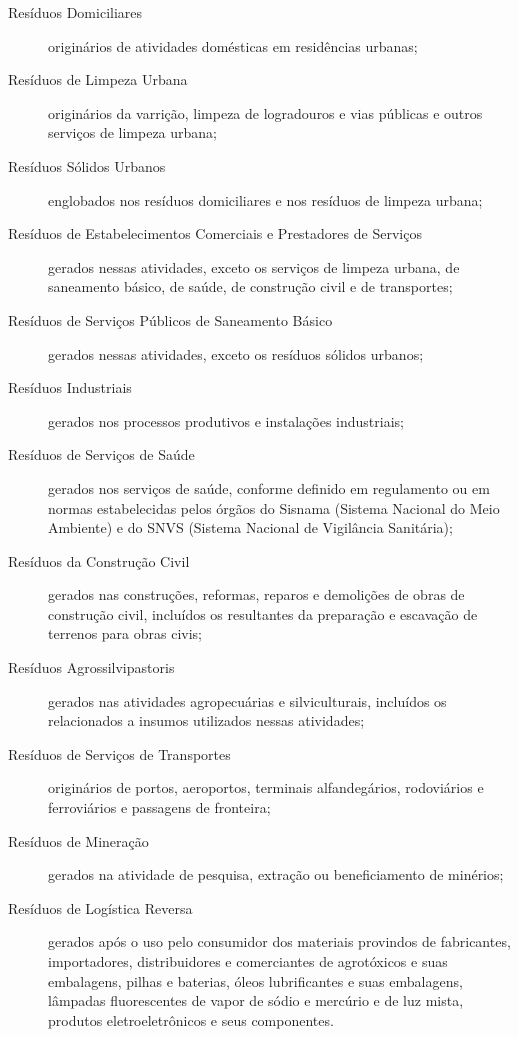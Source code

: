 	\begin{description}
		\item[Resíduos Domiciliares] originários de atividades domésticas em residências urbanas;
		\item[Resíduos de Limpeza Urbana] originários da varrição, limpeza de logradouros e vias públicas e outros serviços de limpeza urbana;
		\item[Resíduos Sólidos Urbanos] englobados nos resíduos domiciliares e nos resíduos de limpeza urbana;
		\item[Resíduos de Estabelecimentos Comerciais e Prestadores de Serviços] gerados nessas atividades, exceto os serviços de limpeza urbana, de saneamento básico, de saúde, de construção civil e de transportes;
		\item[Resíduos de Serviços Públicos de Saneamento Básico] gerados nessas atividades, exceto os resíduos sólidos urbanos;
		\item[Resíduos Industriais] gerados nos processos produtivos e instalações industriais;
		\item[Resíduos de Serviços de Saúde] gerados nos serviços de saúde, conforme definido em regulamento ou em normas estabelecidas pelos órgãos do Sisnama (Sistema Nacional do Meio Ambiente) e do SNVS (Sistema Nacional de Vigilância Sanitária);
		\item[Resíduos da Construção Civil] gerados nas construções, reformas, reparos e demolições de obras de construção civil, incluídos os resultantes da preparação e escavação de terrenos para obras civis;
		\item[Resíduos Agrossilvipastoris] gerados nas atividades agropecuárias e silviculturais, incluídos os relacionados a insumos utilizados nessas atividades;
		\item[Resíduos de Serviços de Transportes] originários de portos, aeroportos, terminais alfandegários, rodoviários e ferroviários e passagens de fronteira;
		\item[Resíduos de Mineração] gerados na atividade de pesquisa, extração ou beneficiamento de minérios;
		\item[Resíduos de Logística Reversa] gerados após o uso pelo consumidor dos materiais provindos de fabricantes, importadores, distribuidores e comerciantes de agrotóxicos e suas embalagens, pilhas e baterias, óleos lubrificantes e suas embalagens, lâmpadas fluorescentes de vapor de sódio e mercúrio e de luz mista, produtos eletroeletrônicos e seus componentes.
		
	\end{description}
	
